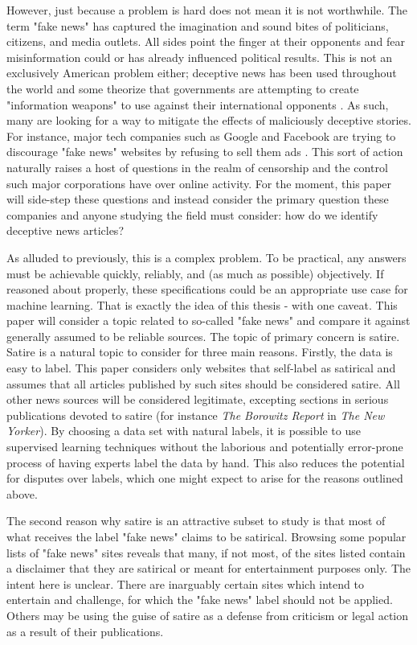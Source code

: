 \documentclass [12 pt] {report}
\begin{document}
However, just because a problem is hard does not mean it is not worthwhile. The term "fake news" has captured the imagination and sound bites of politicians, citizens, and media outlets. All sides point the finger at their opponents and fear misinformation could or has already influenced political results. This is not an exclusively American problem either; deceptive news has been used throughout the world and some theorize that governments are attempting to create "information weapons" to use against their international opponents \cite{Rutenberg}. As such, many are looking for a way to mitigate the effects of maliciously deceptive stories. For instance, major tech companies such as Google and Facebook are trying to discourage "fake news" websites by refusing to sell them ads \cite{Wingfield}. This sort of action naturally raises a host of questions in the realm of censorship and the control such major corporations have over online activity. For the moment, this paper will side-step these questions and instead consider the primary question these companies and anyone studying the field must consider: how do we identify deceptive news articles?

As alluded to previously, this is a complex problem. To be practical, any answers must be achievable quickly, reliably, and (as much as possible) objectively. If reasoned about properly, these specifications could be an appropriate use case for machine learning. That is exactly the idea of this thesis - with one caveat. This paper will consider a topic related to so-called "fake news" and compare it against generally assumed to be reliable sources. The topic of primary concern is satire. Satire is a natural topic to consider for three main reasons. Firstly, the data is easy to label. This paper considers only websites that self-label as satirical and assumes that all articles published by such sites should be considered satire. All other news sources will be considered legitimate, excepting sections in serious publications devoted to satire (for instance \textit{The Borowitz Report} in \textit{The New Yorker}). By choosing a data set with natural labels, it is possible to use supervised learning techniques without the laborious and potentially error-prone process of having experts label the data by hand. This also reduces the potential for disputes over labels, which one might expect to arise for the reasons outlined above.

The second reason why satire is an attractive subset to study is that most of what receives the label "fake news" claims to be satirical. Browsing some popular lists of "fake news" sites \cite{LaCapria} \cite{Schaedel} reveals that many, if not most, of the sites listed contain a disclaimer that they are satirical or meant for entertainment purposes only. The intent here is unclear. There are inarguably certain sites which intend to entertain and challenge, for which the "fake news" label should not be applied. Others may be using the guise of satire as a defense from criticism or legal action as a result of their publications. 
 
\end{document}
